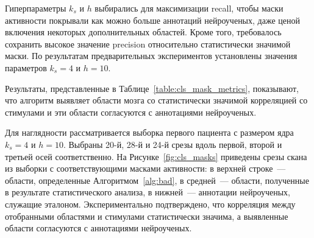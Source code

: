 Гиперпараметры $k_s$ и $h$ выбирались для максимизации recall, чтобы маски активности покрывали как можно больше аннотаций нейроученых, даже ценой включения некоторых дополнительных областей. Кроме того, требовалось сохранить высокое значение precision относительно статистически значимой маски. По результатам предварительных экспериментов установлены значения параметров $k_s = 4$ и $h = 10$.

\begin{table}[h!]
    \centering
    \caption{Метрики сравнения масок активности, усредненные по пациентам. В таблице представлены средние значения и стандартные отклонения для каждой метрики}\label{table:cls_mask_metrics}
\end{table}

Результаты, представленные в Таблице~\ref{table:cls_mask_metrics}, показывают, что алгоритм выявляет области мозга со статистически значимой корреляцией со стимулами и эти области согласуются с аннотациями нейроученых.

Для наглядности рассматривается выборка первого пациента с размером ядра $k_s = 4$ и $h = 10$. Выбраны 20-й, 28-й и 24-й срезы вдоль первой, второй и третьей осей соответственно. На Рисунке~\ref{fig:cls_masks} приведены срезы скана из выборки с соответствующими масками активности: в верхней строке~--- области, определенные Алгоритмом~\ref{alg:bad}, в средней~--- области, полученные в результате статистического анализа, в нижней~--- аннотации нейроученых, служащие эталоном. Экспериментально подтверждено, что корреляция между отобранными областями и стимулами статистически значима, а выявленные области согласуются с аннотациями нейроученых.

